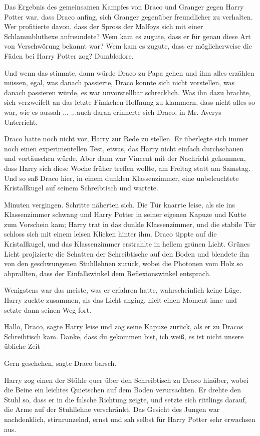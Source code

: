 Das Ergebnis des gemeinsamen Kampfes von Draco und Granger gegen Harry Potter
war, dass Draco anfing, sich Granger gegenüber freundlicher zu verhalten. Wer
profitierte davon, dass der Spross der Malfoys sich mit einer Schlammbluthexe
anfreundete? Wem kam es zugute, dass er für genau diese Art von Verschwörung
bekannt war? Wem kam es zugute, dass er möglicherweise die Fäden bei Harry
Potter zog? Dumbledore.

Und wenn das stimmte, dann würde Draco zu Papa gehen und ihm alles erzählen
müssen, egal, was danach passierte, Draco konnte sich nicht vorstellen, was
danach passieren würde, es war unvorstellbar schrecklich. Was ihn dazu brachte,
sich verzweifelt an das letzte Fünkchen Hoffnung zu klammern, dass nicht alles
so war, wie es aussah ... ...auch daran erinnerte sich Draco, in Mr. Averys
Unterricht.

Draco hatte noch nicht vor, Harry zur Rede zu stellen. Er überlegte sich immer
noch einen experimentellen Test, etwas, das Harry nicht einfach durchschauen und
vortäuschen würde. Aber dann war Vincent mit der Nachricht gekommen, dass Harry
sich diese Woche früher treffen wollte, am Freitag statt am Samstag. Und so saß
Draco hier, in einem dunklen Klassenzimmer, eine unbeleuchtete Kristallkugel auf
seinem Schreibtisch und wartete.

Minuten vergingen. Schritte näherten sich. Die Tür knarrte leise, als sie ins
Klassenzimmer schwang und Harry Potter in seiner eigenen Kapuze und Kutte zum
Vorschein kam; Harry trat in das dunkle Klassenzimmer, und die stabile Tür
schloss sich mit einem leisen Klicken hinter ihm. Draco tippte auf die
Kristallkugel, und das Klassenzimmer erstrahlte in hellem grünen Licht. Grünes
Licht projizierte die Schatten der Schreibtische auf den Boden und blendete ihn
von den geschwungenen Stuhllehnen zurück, wobei die Photonen vom Holz so
abprallten, dass der Einfallswinkel dem Reflexionswinkel entsprach.

Wenigstens war das meiste, was er erfahren hatte, wahrscheinlich keine Lüge.
Harry zuckte zusammen, als das Licht anging, hielt einen Moment inne und setzte
dann seinen Weg fort.

\glqq{}Hallo, Draco\grqq{}, sagte Harry leise und zog seine Kapuze zurück, als er
zu Dracos Schreibtisch kam. \glqq{}Danke, dass du gekommen bist, ich weiß, es ist
nicht unsere übliche Zeit -\grqq{}

\glqq{}Gern geschehen\grqq{}, sagte Draco barsch.

Harry zog einen der Stühle quer über den Schreibtisch zu Draco hinüber, wobei
die Beine ein leichtes Quietschen auf dem Boden verursachten. Er drehte den
Stuhl so, dass er in die falsche Richtung zeigte, und setzte sich rittlings
darauf, die Arme auf der Stuhllehne verschränkt. Das Gesicht des Jungen war
nachdenklich, stirnrunzelnd, ernst und sah selbst für Harry Potter sehr
erwachsen aus.

